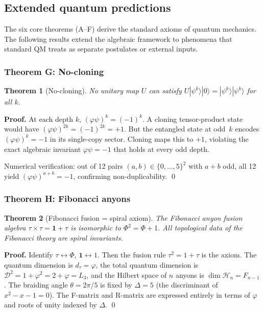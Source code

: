 \documentclass[12pt,a4paper]{article}
\newtheorem{theorem}{Theorem}[section]
\begin{document}
\subsection{Extended quantum predictions}
\label{sec:extended-quantum}

The six core theorems (A--F) derive the standard axioms of quantum mechanics.  The following results extend the algebraic framework to phenomena that standard QM treats as separate postulates or external inputs.

\subsubsection{Theorem G: No-cloning}

\begin{theorem}[No-cloning]
No unitary map $U$ can satisfy $U|\psi^k\rangle|0\rangle = |\psi^k\rangle|\psi^k\rangle$ for all $k$.
\end{theorem}

\textbf{Proof.}  At each depth $k$, $(\varphi\psi)^k = (-1)^k$.  A cloning tensor-product state would have $(\varphi\psi)^{2k} = (-1)^{2k} = +1$.  But the entangled state at odd~$k$ encodes $(\varphi\psi)^k = -1$ in its single-copy sector.  Cloning maps this to $+1$, violating the exact algebraic invariant $\varphi\psi = -1$ that holds at every odd depth.

Numerical verification: out of 12 pairs $(a,b) \in \{0,\ldots,5\}^2$ with $a + b$ odd, all 12 yield $(\varphi\psi)^{a+b} = -1$, confirming non-duplicability.  \qed

\subsubsection{Theorem H: Fibonacci anyons}

\begin{theorem}[Fibonacci fusion = spiral axiom]
The Fibonacci anyon fusion algebra $\tau \times \tau = \mathbf{1} + \tau$ is isomorphic to $\Phi^2 = \Phi + 1$.  All topological data of the Fibonacci theory are spiral invariants.
\end{theorem}

\textbf{Proof.}  Identify $\tau \leftrightarrow \Phi$, $\mathbf{1} \leftrightarrow 1$.  Then the fusion rule $\tau^2 = 1 + \tau$ is the axiom.  The quantum dimension is $d_\tau = \varphi$, the total quantum dimension is $\mathcal{D}^2 = 1 + \varphi^2 = 2 + \varphi = L_3$, and the Hilbert space of $n$ anyons is $\dim \mathcal{H}_n = F_{n-1}$.  The braiding angle $\theta = 2\pi/5$ is fixed by $\Delta = 5$ (the discriminant of $x^2 - x - 1 = 0$).  The F-matrix and R-matrix are expressed entirely in terms of $\varphi$ and roots of unity indexed by $\Delta$.  \qed
\end{document}
